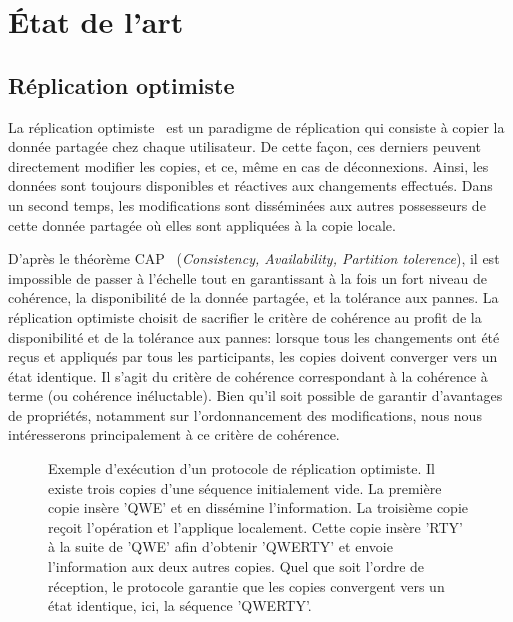 
\section{État de l'art}

\subsection{Réplication optimiste}

La réplication optimiste~\cite{demers1987epidemic, saito2005optimistic} est un
paradigme de réplication qui consiste à copier la donnée partagée chez chaque
utilisateur. De cette façon, ces derniers peuvent directement modifier les
copies, et ce, même en cas de déconnexions.  Ainsi, les données sont toujours
disponibles et réactives aux changements effectués. Dans un second temps, les
modifications sont disséminées aux autres possesseurs de cette donnée partagée
où elles sont appliquées à la copie locale.

D'après le théorème CAP~\cite{gilbert2002brewer} (\emph{Consistency,
  Availability, Partition tolerence}), il est impossible de passer à l'échelle
tout en garantissant à la fois un fort niveau de cohérence, la disponibilité de
la donnée partagée, et la tolérance aux pannes. La réplication optimiste choisit
de sacrifier le critère de cohérence au profit de la disponibilité et de la
tolérance aux pannes: lorsque tous les changements ont été reçus et appliqués par
tous les participants, les copies doivent converger vers un état identique. Il
s'agit du critère de cohérence correspondant à la cohérence à terme (ou
cohérence inéluctable). Bien qu'il soit possible de garantir d'avantages de
propriétés, notamment sur l'ordonnancement des modifications, nous nous
intéresserons principalement à ce critère de cohérence.

\begin{figure}
  \centering
  
  \caption{\label{fig:optimisticexample}Exemple d'exécution d'un protocole de
    réplication optimiste. Il existe trois copies d'une séquence initialement
    vide. La première copie insère 'QWE' et en dissémine l'information. La
    troisième copie reçoit l'opération et l'applique localement. Cette copie
    insère 'RTY' à la suite de 'QWE' afin d'obtenir 'QWERTY' et envoie
    l'information aux deux autres copies. Quel que soit l'ordre de réception, le
    protocole garantie que les copies convergent vers un état identique, ici, la
    séquence 'QWERTY'.}
\end{figure}

